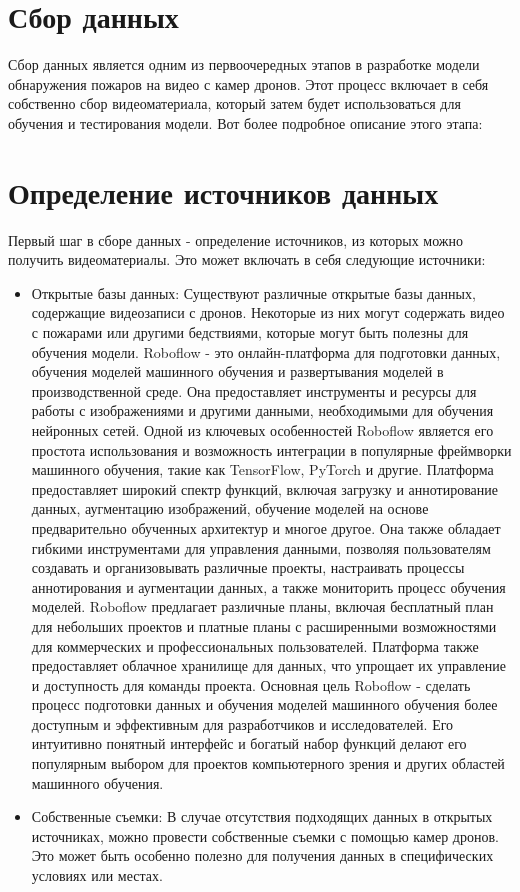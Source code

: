     \section{Сбор данных}
    Сбор данных является одним из первоочередных этапов в разработке модели обнаружения пожаров на видео с камер дронов. Этот процесс включает в себя собственно сбор видеоматериала, который затем будет использоваться для обучения и тестирования модели. Вот более подробное описание этого этапа:

    \section{Определение источников данных}
    Первый шаг в сборе данных - определение источников, из которых можно получить видеоматериалы. Это может включать в себя следующие источники:
    \begin{itemize}
        \item Открытые базы данных: Существуют различные открытые базы данных, содержащие видеозаписи с дронов. Некоторые из них могут содержать видео с пожарами или другими бедствиями, которые могут быть полезны для обучения модели. Roboflow - это онлайн-платформа для подготовки данных, обучения моделей машинного обучения и развертывания моделей в производственной среде. Она предоставляет инструменты и ресурсы для работы с изображениями и другими данными, необходимыми для обучения нейронных сетей. Одной из ключевых особенностей Roboflow является его простота использования и возможность интеграции в популярные фреймворки машинного обучения, такие как TensorFlow, PyTorch и другие. Платформа предоставляет широкий спектр функций, включая загрузку и аннотирование данных, аугментацию изображений, обучение моделей на основе предварительно обученных архитектур и многое другое. Она также обладает гибкими инструментами для управления данными, позволяя пользователям создавать и организовывать различные проекты, настраивать процессы аннотирования и аугментации данных, а также мониторить процесс обучения моделей. Roboflow предлагает различные планы, включая бесплатный план для небольших проектов и платные планы с расширенными возможностями для коммерческих и профессиональных пользователей. Платформа также предоставляет облачное хранилище для данных, что упрощает их управление и доступность для команды проекта. Основная цель Roboflow - сделать процесс подготовки данных и обучения моделей машинного обучения более доступным и эффективным для разработчиков и исследователей. Его интуитивно понятный интерфейс и богатый набор функций делают его популярным выбором для проектов компьютерного зрения и других областей машинного обучения.
        \item Собственные съемки: В случае отсутствия подходящих данных в открытых источниках, можно провести собственные съемки с помощью камер дронов. Это может быть особенно полезно для получения данных в специфических условиях или местах.
    \end{itemize}

